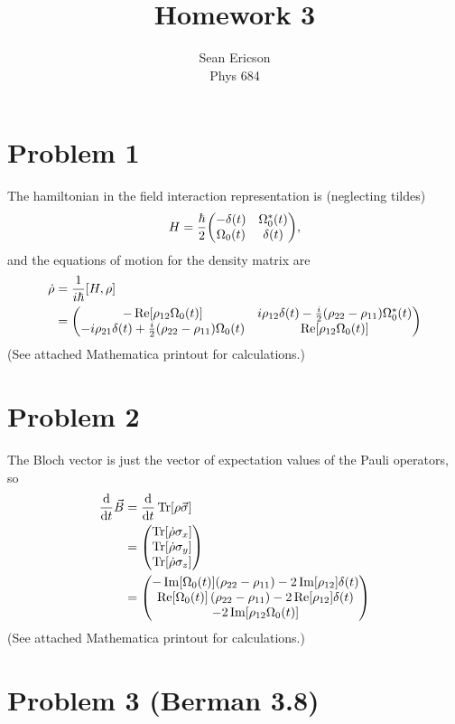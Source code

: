 \documentclass[12pt]{article}
\begin{document}
	
\title{Homework 3}
\author{Sean Ericson \\ Phys 684}
\maketitle

\section*{Problem 1}
The hamiltonian in the field interaction representation is (neglecting tildes)
\[ H = \frac{\hbar}{2}\mqty(-\delta(t)&\Omega_0^*(t)\\\Omega_0(t)&\delta(t)), \]
and the equations of motion for the density matrix are 
\begin{align*}
    \dot{\rho} &= \frac{1}{i\hbar}\comm{H}{\rho} \\
    &= \mqty(-\Re[\rho_{12}\Omega_0(t)]&i\rho_{12}\delta(t) - \frac{i}{2}(\rho_{22}-\rho_{11})\Omega_0^*(t) \\ -i\rho_{21}\delta(t) + \frac{i}{2}(\rho_{22}-\rho_{11})\Omega_0(t) & \Re[\rho_{12}\Omega_0(t)])
\end{align*}
(See attached Mathematica printout for calculations.)

\section*{Problem 2}
The Bloch vector is just the vector of expectation values of the Pauli operators, so
\begin{align*}
    \dv{t}\vec{B} &= \dv{t}\Tr[\rho\vec{\sigma}] \\
    &= \mqty(\Tr[\dot\rho\sigma_x]\\\Tr[\dot\rho\sigma_y]\\\Tr[\dot\rho\sigma_z]) \\
    &= \mqty(-\Im[\Omega _0(t)] (\rho _{22}-\rho _{11}) - 2\Im[\rho_{12}] \delta(t) \\ \Re[\Omega _0(t)] \left(\rho _{22}-\rho _{11}\right) - 2\Re[\rho_{12}] \delta (t) \\ -2\Im[\rho_{12}\Omega_0(t)])
\end{align*}
(See attached Mathematica printout for calculations.)

\section*{Problem 3 (Berman 3.8)}
\end{document}
